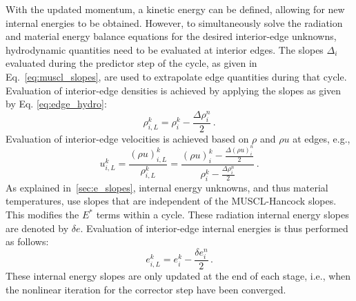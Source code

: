 \documentclass[preprint,12pt]{elsarticle}
\newcommand{\pep}{\, .}
\newcommand{\iL}{_{i,L}}
\begin{document}
With the updated momentum, a kinetic energy can be defined, allowing for new internal
energies to be obtained.  However, to simultaneously solve the radiation and material
energy balance equations for the desired interior-edge unknowns,
hydrodynamic quantities need to be evaluated at interior edges. The slopes $\Delta_i$
evaluated during the predictor step of the cycle, as given in Eq.~\eqref{eq:muscl_slopes}, are used
to extrapolate edge quantities during that cycle.  Evaluation of interior-edge
densities is achieved by applying the slopes as given by Eq. \eqref{eq:edge_hydro}:
\begin{equation}
   \rho\iL^k = \rho_i^k - \frac{\Delta\rho_i^n}{2} \pep
\end{equation}
Evaluation of interior-edge velocities is
achieved based on $\rho$ and $\rho u$ at edges, e.g.,
\begin{equation}
   u\iL^k = \frac{(\rho u)\iL^k}{\rho\iL^k}
          = \frac{(\rho u)_i^k - \frac{\Delta(\rho u)_i^n}{2}}
                 {\rho_i^k - \frac{\Delta\rho_i^n}{2}} \pep
\end{equation}
As explained in~\ref{sec:e_slopes}, internal energy unknowns, and thus material
temperatures, use slopes that are independent of the MUSCL-Hancock slopes.  This modifies
the $E^*$ terms within a cycle.
These radiation internal energy slopes are denoted by $\delta e$. Evaluation
of interior-edge internal energies is thus performed as follows:
\begin{equation}
   e\iL^k = e_i^k - \frac{\delta e_i^n}{2} \pep
\end{equation}
 These internal energy slopes are only updated at the end of each stage, i.e.,
when the nonlinear iteration for the corrector step have been converged.
\end{document}
